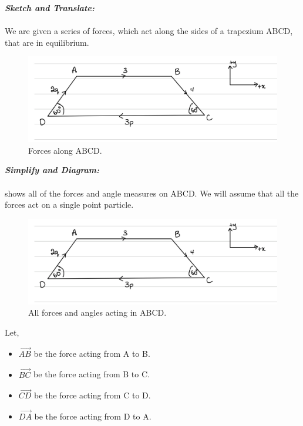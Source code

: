\begin{subquestions}
\textbf{\textit{Sketch and Translate:}} \\ \\
We are given a series of forces, which act along the sides of a trapezium ABCD, that are in equilibrium.
\begin{figure}[H]
	\begin{center}
		\includegraphics[scale=0.25]{../2007/figures/2008Mq6Diagram2}
		\caption{\label{2008M:q6:Sketch2} Forces along ABCD.}
	\end{center}
\end{figure}




\textbf{\textit{Simplify and Diagram:}} \\ \\ 
 shows all of the forces and angle measures on ABCD. We will assume that all the forces act on a single point particle.
\begin{figure}[H]
	\begin{center}
		\includegraphics[scale=0.25]{../2007/figures/2008Mq6Diagram2}
		\caption{\label{2008M:q6:Diagram2} All forces and angles acting in ABCD.}
	\end{center}
\end{figure}

Let,
\begin{itemize}
	\item $\vec{AB}$ be the force acting from A to B.
	\item $\vec{BC}$ be the force acting from B to C.
	\item $\vec{CD}$ be the force acting from C to D.
	\item $\vec{DA}$ be the force acting from D to A.
\end{itemize}


\end{subquestions}
